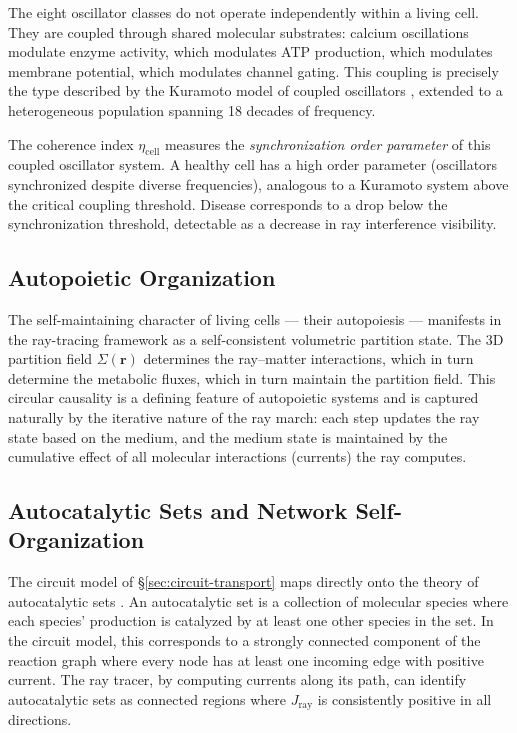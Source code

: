 \documentclass[11pt,twocolumn,a4paper]{article}
\newcommand{\etacell}{\eta_{\mathrm{cell}}}
\newcommand{\Jray}{J_{\mathrm{ray}}}
\begin{document}
The eight oscillator classes do not operate independently within a
living cell. They are coupled through shared molecular substrates:
calcium oscillations modulate enzyme activity, which modulates ATP
production, which modulates membrane potential, which modulates channel
gating. This coupling is precisely the type described by the Kuramoto
model of coupled oscillators \citep{kuramoto1975}, extended to a
heterogeneous population spanning 18 decades of frequency.

The coherence index $\etacell$ measures the \emph{synchronization
order parameter} of this coupled oscillator system. A healthy cell has
a high order parameter (oscillators synchronized despite diverse
frequencies), analogous to a Kuramoto system above the critical
coupling threshold. Disease corresponds to a drop below the
synchronization threshold, detectable as a decrease in ray
interference visibility.

\subsection{Autopoietic Organization}

The self-maintaining character of living cells --- their autopoiesis
\citep{varelamaturana1980} --- manifests in the ray-tracing framework
as a self-consistent volumetric partition state. The 3D partition field
$\Sigma(\mathbf{r})$ determines the ray--matter interactions, which in
turn determine the metabolic fluxes, which in turn maintain the
partition field. This circular causality is a defining feature of
autopoietic systems and is captured naturally by the iterative nature
of the ray march: each step updates the ray state based on the medium,
and the medium state is maintained by the cumulative effect of all
molecular interactions (currents) the ray computes.

\subsection{Autocatalytic Sets and Network Self-Organization}

The circuit model of \S\ref{sec:circuit-transport} maps directly onto
the theory of autocatalytic sets \citep{kauffman1986}. An autocatalytic
set is a collection of molecular species where each species'
production is catalyzed by at least one other species in the set.
In the circuit model, this corresponds to a strongly connected
component of the reaction graph where every node has at least one
incoming edge with positive current. The ray tracer, by computing
currents along its path, can identify autocatalytic sets as connected
regions where $\Jray$ is consistently positive in all directions.
\end{document}
